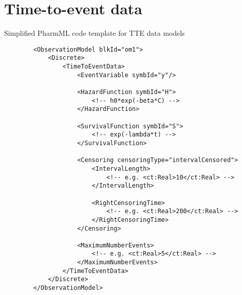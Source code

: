\section{Time-to-event data}
Simplified PharmML code template for TTE data models
\lstset{language=XML}
\begin{lstlisting}
        <ObservationModel blkId="om1">
            <Discrete>
                <TimeToEventData>
                    <EventVariable symbId="y"/>
                    
                    <HazardFunction symbId="H">
                        <!-- h0*exp(-beta*C) -->
                    </HazardFunction>
                    
                    <SurvivalFunction symbId="S">
                        <!-- exp(-lambda*t) -->
                    </SurvivalFunction>
                    
                    <Censoring censoringType="intervalCensored">    
                        <IntervalLength>
                            <!-- e.g. <ct:Real>10</ct:Real> -->
                        </IntervalLength>
                        
                        <RightCensoringTime>
                            <!-- e.g. <ct:Real>200</ct:Real> -->
                        </RightCensoringTime>
                    </Censoring>
                    
                    <MaximumNumberEvents>
                        <!-- e.g. <ct:Real>5</ct:Real> -->
                    </MaximumNumberEvents>
                </TimeToEventData>
            </Discrete>
        </ObservationModel>
\end{lstlisting}

